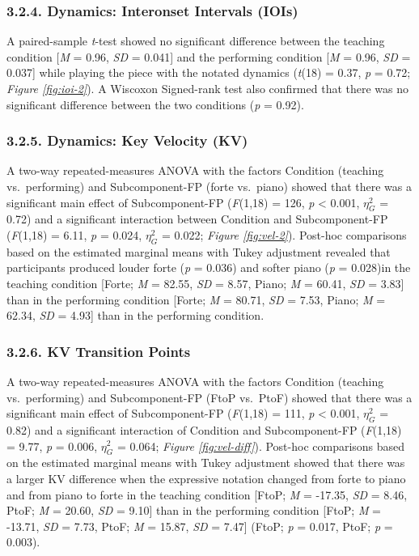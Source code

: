 \documentclass[
  english,
  man,floatsintext]{apa6}
\begin{document}
\hypertarget{dynamics-interonset-intervals-iois-1}{%
\subsubsection{3.2.4. Dynamics: Interonset Intervals (IOIs)}\label{dynamics-interonset-intervals-iois-1}}

A paired-sample \emph{t}-test showed no significant difference between the teaching condition {[}\emph{M} = 0.96, \emph{SD} = 0.041{]} and the performing condition {[}\emph{M} = 0.96, \emph{SD} = 0.037{]} while playing the piece with the notated dynamics (\emph{t}(18) = 0.37, \emph{p} = 0.72; \emph{Figure \ref{fig:ioi-2}}). A Wiscoxon Signed-rank test also confirmed that there was no significant difference between the two conditions (\emph{p} = 0.92).

\hypertarget{dynamics-key-velocity-kv-1}{%
\subsubsection{3.2.5. Dynamics: Key Velocity (KV)}\label{dynamics-key-velocity-kv-1}}

A two-way repeated-measures ANOVA with the factors Condition (teaching vs.~performing) and Subcomponent-FP (forte vs.~piano) showed that there was a significant main effect of Subcomponent-FP (\emph{F}(1,18) = 126, \emph{p} \textless{} 0.001, \(\eta_G^2\) = 0.72) and a significant interaction between Condition and Subcomponent-FP (\emph{F}(1,18) = 6.11, \emph{p} = 0.024, \(\eta_G^2\) = 0.022; \emph{Figure \ref{fig:vel-2}}). Post-hoc comparisons based on the estimated marginal means with Tukey adjustment revealed that participants produced louder forte (\emph{p} = 0.036) and softer piano (\emph{p} = 0.028)in the teaching condition {[}Forte; \emph{M} = 82.55, \emph{SD} = 8.57, Piano; \emph{M} = 60.41, \emph{SD} = 3.83{]} than in the performing condition {[}Forte; \emph{M} = 80.71, \emph{SD} = 7.53, Piano; \emph{M} = 62.34, \emph{SD} = 4.93{]} than in the performing condition.

\hypertarget{kv-transition-points}{%
\subsubsection{3.2.6. KV Transition Points}\label{kv-transition-points}}

A two-way repeated-measures ANOVA with the factors Condition (teaching vs.~performing) and Subcomponent-FP (FtoP vs.~PtoF) showed that there was a significant main effect of Subcomponent-FP (\emph{F}(1,18) = 111, \emph{p} \textless{} 0.001, \(\eta_G^2\) = 0.82) and a significant interaction of Condition and Subcomponent-FP (\emph{F}(1,18) = 9.77, \emph{p} = 0.006, \(\eta_G^2\) = 0.064; \emph{Figure \ref{fig:vel-diff}}). Post-hoc comparisons based on the estimated marginal means with Tukey adjustment showed that there was a larger KV difference when the expressive notation changed from forte to piano and from piano to forte in the teaching condition {[}FtoP; \emph{M} = -17.35, \emph{SD} = 8.46, PtoF; \emph{M} = 20.60, \emph{SD} = 9.10{]} than in the performing condition {[}FtoP; \emph{M} = -13.71, \emph{SD} = 7.73, PtoF; \emph{M} = 15.87, \emph{SD} = 7.47{]} (FtoP; \emph{p} = 0.017, PtoF; \emph{p} = 0.003).
\end{document}
